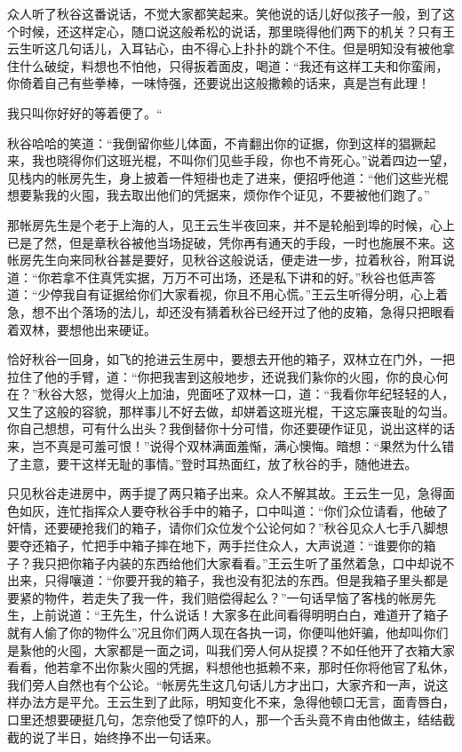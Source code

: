 \documentclass[12pt,UTF8]{ctexbook}
\begin{document}
{{{众人听了秋谷这番说话，不觉大家都笑起来。笑他说的话儿好似孩子一般，到了这个时候，还这样定心，随口说这般希松的说话，那里晓得他们两下的机关？只有王云生听这几句话儿，入耳钻心，由不得心上扑扑的跳个不住。但是明知没有被他拿住什么破绽，料想也不怕他，只得扳着面皮，喝道：“我还有这样工夫和你蛮闹，你倚着自己有些拳棒，一味恃强，还要说出这般撒赖的话来，真是岂有此理！

我只叫你好好的等着便了。“

秋谷哈哈的笑道：“我倒留你些儿体面，不肯翻出你的证据，你到这样的猖獗起来，我也晓得你们这班光棍，不叫你们见些手段，你也不肯死心。”说着四边一望，见栈内的帐房先生，身上披着一件短褂也走了进来，便招呼他道：“他们这些光棍想要紥我的火囤，我去取出他们的凭据来，烦你作个证见，不要被他们跑了。”

那帐房先生是个老于上海的人，见王云生半夜回来，并不是轮船到埠的时候，心上已是了然，但是章秋谷被他当场捉破，凭你再有通天的手段，一时也施展不来。这帐房先生向来同秋谷甚是要好，见秋谷这般说话，便走进一步，拉着秋谷，附耳说道：“你若拿不住真凭实据，万万不可出场，还是私下讲和的好。”秋谷也低声答道：“少停我自有证据给你们大家看视，你且不用心慌。”王云生听得分明，心上着急，想不出个落场的法儿，却还没有猜着秋谷已经开过了他的皮箱，急得只把眼看着双林，要想他出来硬证。

恰好秋谷一回身，如飞的抢进云生房中，要想去开他的箱子，双林立在门外，一把拉住了他的手臂，道：“你把我害到这般地步，还说我们紥你的火囤，你的良心何在？”秋谷大怒，觉得火上加油，兜面呸了双林一口，道：“我看你年纪轻轻的人，又生了这般的容貌，那样事儿不好去做，却姘着这班光棍，干这忘廉丧耻的勾当。你自己想想，可有什么出头？我倒替你十分可惜，你还要硬作证见，说出这样的话来，岂不真是可羞可恨！”说得个双林满面羞惭，满心懊悔。暗想：“果然为什么错了主意，要干这样无耻的事情。”登时耳热面红，放了秋谷的手，随他进去。

只见秋谷走进房中，两手提了两只箱子出来。众人不解其故。王云生一见，急得面色如灰，连忙指挥众人要夺秋谷手中的箱子，口中叫道：“你们众位请看，他破了奸情，还要硬抢我们的箱子，请你们众位发个公论何如？”秋谷见众人七手八脚想要夺还箱子，忙把手中箱子摔在地下，两手拦住众人，大声说道：“谁要你的箱子？我只把你箱子内装的东西给他们大家看看。”王云生听了虽然着急，口中却说不出来，只得嚷道：“你要开我的箱子，我也没有犯法的东西。但是我箱子里头都是要紧的物件，若走失了我一件，我们赔偿得起么？”一句话早恼了客栈的帐房先生，上前说道：“王先生，什么说话！大家多在此间看得明明白白，难道开了箱子就有人偷了你的物件么”况且你们两人现在各执一词，你便叫他奸骗，他却叫你们是紥他的火囤，大家都是一面之词，叫我们旁人何从捉摸？不如任他开了衣箱大家看看，他若拿不出你紥火囤的凭据，料想他也抵赖不来，那时任你将他官了私休，我们旁人自然也有个公论。“帐房先生这几句话儿方才出口，大家齐和一声，说这样办法方是平允。王云生到了此际，明知变化不来，急得他顿口无言，面青唇白，口里还想要硬挺几句，怎奈他受了惊吓的人，那一个舌头竟不肯由他做主，结结截截的说了半日，始终挣不出一句话来。

}}}
\end{document}
